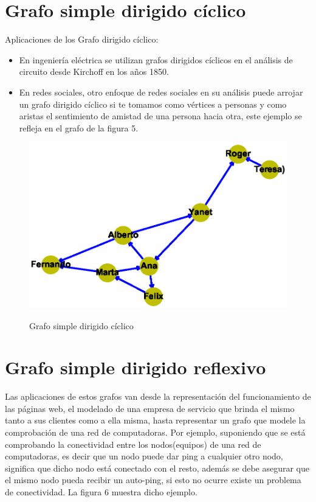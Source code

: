 \documentclass{article}
\begin{document}
\section{Grafo simple dirigido cíclico}
Aplicaciones de los Grafo dirigido cíclico:
\begin{itemize}
\item En ingeniería eléctrica se utilizan grafos dirigidos cíclicos en el análisis de circuito desde Kirchoff en los años 1850.
\item En redes sociales, otro enfoque de redes sociales en su análisis puede arrojar un grafo dirigido cíclico si te tomamos como vértices a personas y como aristas el sentimiento de amistad de una persona hacia otra, este ejemplo se refleja en el grafo de la figura 5.


\end{itemize}
\begin{center}

\end{center}

\begin{figure}[h]
\begin{center}
\includegraphics[scale=0.7]{Graf5.eps}\\
\caption{Grafo simple dirigido cíclico}
\end{center}

\end{figure}
\section{Grafo simple dirigido reflexivo}

Las aplicaciones de estos grafos van desde la representación del funcionamiento de las páginas web, el modelado de una empresa de servicio que brinda el mismo tanto a sus clientes como a ella misma, hasta representar un grafo que modele la comprobación de una red de computadoras. \linebreak
Por ejemplo, suponiendo que se está comprobando la conectividad entre los nodos(equipos) de una red de computadoras, es decir que un nodo puede dar ping a cualquier otro nodo, significa que dicho nodo está conectado con el resto, además se debe asegurar que el mismo nodo pueda recibir un auto-ping, si esto no ocurre existe un problema de conectividad. La figura 6 muestra dicho ejemplo.
\end{document}
